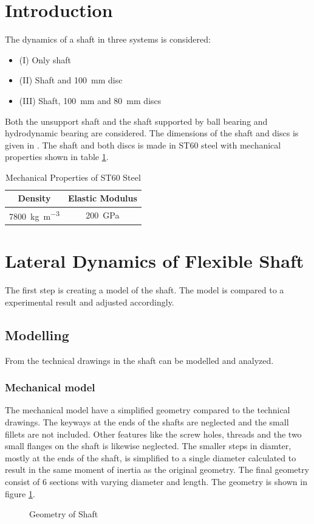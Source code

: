 \section{Introduction}
The dynamics of a shaft in three systems is considered:
\begin{itemize}
    \item (I) Only shaft
    \item (II) Shaft and \SI{100}{\milli \meter} disc
    \item (III) Shaft, \SI{100}{\milli \meter} and \SI{80}{\milli \meter} discs
\end{itemize}
Both the unsupport shaft and the shaft supported by ball bearing and hydrodynamic bearing are considered. The dimensions of the shaft and discs is given in \cite[Appendix]{Problem}.
The shaft and both discs is made in ST60 steel with mechanical properties shown in table \ref{tab:mech_prop}.
\begin{table}[htbp]
    \centering
    \caption{Mechanical Properties of ST60 Steel}
    \label{tab:mech_prop}
    \begin{tabular}{@{}cc@{}}
        \toprule
        Density                                       &   Elastic Modulus         \\ \midrule
        \SI{7800}{\kilo \gram \per \cubic \meter}             &   \SI{200}{\giga \pascal}  \\ \bottomrule
    \end{tabular}
\end{table}



\section{Lateral Dynamics of Flexible Shaft}
The first step is creating a model of the shaft. The model is compared to a experimental result and adjusted accordingly.

\subsection{Modelling}
From the technical drawings in \cite[Appendix]{Problem} the shaft can be modelled and analyzed.

\subsubsection{Mechanical model}
The mechanical model have a simplified geometry compared to the technical drawings. The keyways at the ends of the shafts are neglected and the small fillets are not included. Other features like the screw holes, threads and the two small flanges on the shaft is likewise neglected.
The smaller steps in diamter, mostly at the ends of the shaft, is simplified to a single diameter calculated to result in the same moment of inertia as the original geometry.
The final geometry consist of 6 sections with varying diameter and length. The geometry is shown in figure \ref{fig:shaft_geometry}.
\begin{figure}[htbp]
    \centering
    
    \caption{Geometry of Shaft}
    \label{fig:shaft_geometry}
\end{figure}

